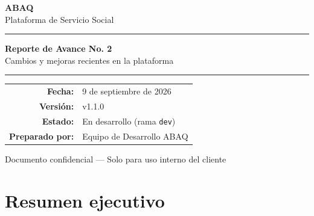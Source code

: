 \documentclass[12pt, a4paper]{article}
\begin{document}
\begin{titlepage}
  \centering
  \vspace*{2cm}

  {\Huge\bfseries\color{primary} ABAQ}\\[0.4cm]
  {\large\color{darkgray} Plataforma de Servicio Social}

  \vspace{1.5cm}
  \rule{0.6\textwidth}{1.5pt}
  \vspace{1cm}

  {\LARGE\bfseries Reporte de Avance No. 2}\\[0.5cm]
  {\large\color{darkgray} Cambios y mejoras recientes en la plataforma}

  \vspace{1cm}
  \rule{0.6\textwidth}{0.5pt}
  \vspace{1.5cm}

  \begin{tabular}{rl}
    \textbf{Fecha:}        & 9 de septiembre de 2026 \\[0.3em]
    \textbf{Versión:}      & v1.1.0 \\[0.3em]
    \textbf{Estado:}       & En desarrollo (rama \texttt{dev}) \\[0.3em]
    \textbf{Preparado por:}& Equipo de Desarrollo ABAQ \\
  \end{tabular}

  \vfill
  {\small\color{darkgray} Documento confidencial — Solo para uso interno del cliente}
\end{titlepage}

\newpage
\thispagestyle{fancy}
\section*{Resumen ejecutivo}
\end{document}
